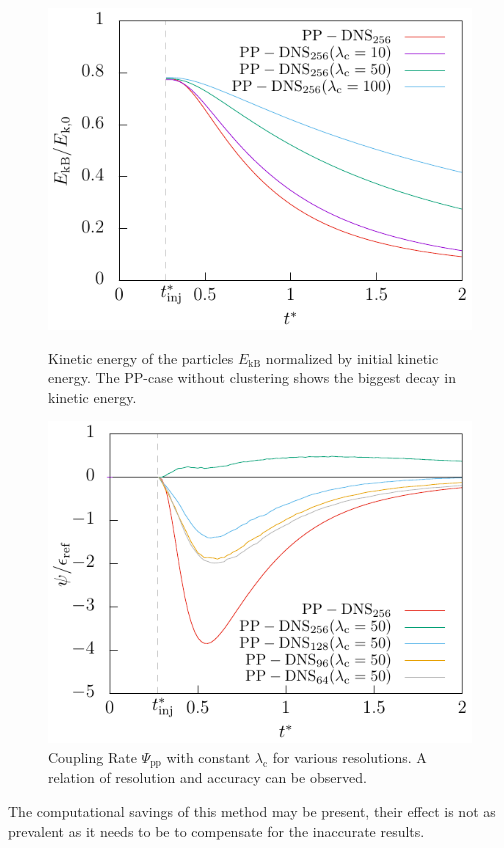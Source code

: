 \documentclass[11pt,a4paper,openany,oneside,parskip=half*]{article}
\begin{document}
\begin{figure}[h]
    \centering
    \begin{minipage}[t]{.5\textwidth}
         \centering
        \includegraphics[width=\linewidth]{./Abbildungen/256/particlekineticenergy_time.pdf}
        \caption{Kinetic energy of the particles $E_\mathrm{kB}$ normalized by initial kinetic energy. The PP-case without clustering shows the biggest decay in kinetic energy. }
        \label{particlekineticenergy_time_256}
    \end{minipage}%
    \begin{minipage}[t]{0.5\textwidth}
        \centering
        \includegraphics[width=\linewidth]{./Abbildungen/vergleich_coupling_time.pdf}
        \caption{Coupling Rate $\Psi_\mathrm{pp}$ with constant $\lambda_\mathrm{c}$ for various resolutions. A relation of resolution and accuracy can be observed.}
        \label{vergleich_coupling_time_256}
    \end{minipage}
\end{figure}
\newline
The computational savings of this method may be present, their effect is not as prevalent as it needs to be to compensate for the inaccurate results.
\pagebreak
\end{document}
